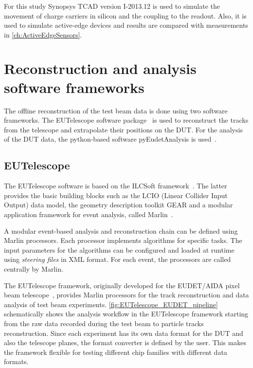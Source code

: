 For this study Synopsys TCAD version I-2013.12 is used to simulate the
movement of charge carriers in silicon and the coupling to the
readout. Also, it is used to simulate active-edge devices and results
are compared with measurements in \cref{ch:ActiveEdgeSensors}.

\section{Reconstruction and analysis software frameworks}
\label{sec:recoSoft}

The offline reconstruction of the test beam data is done using two
software frameworks. The EUTelescope software
package~\cite{Rubinskiy,EutelescopeWebsite} is used to reconstruct the
tracks from the telescope and extrapolate their positions on the
DUT. For the analysis of the DUT data, the python-based software
pyEudetAnalysis is used~\cite{pyeudet}.

\subsection{EUTelescope}
\label{sec:EUTelescope}
The EUTelescope software is based on the ILCSoft
framework~\cite{Aplin:2009zz}. The latter provides the basic building
blocks such as the LCIO (Linear Collider Input Output) data model, the
geometry description toolkit GEAR and a modular application framework
for event analysis, called Marlin~\cite{Gaede:2006pj}.

A modular event-based analysis and reconstruction chain can be defined
using Marlin processors. Each processor implements algorithms for
specific tasks. The input parameters for the algorithms can be
configured and loaded at runtime using \textit{steering files} in XML
format. For each event, the processors are called centrally by Marlin.

The EUTelescope framework, originally developed for the EUDET/AIDA
pixel beam telescope~\cite{Rubinskiy:2014kza}, provides Marlin
processors for the track reconstruction and data analysis of test beam
experiments. \cref{fig:EUTelescope_EUDET_pipeline} schematically shows
the analysis workflow in the EUTelescope framework starting from the
raw data recorded during the test beam to particle tracks
reconstruction. Since each experiment has its own data format for the
DUT and also the telescope planes, the format converter is defined by
the user. This makes the framework flexible for testing different chip
families with different data formats.

